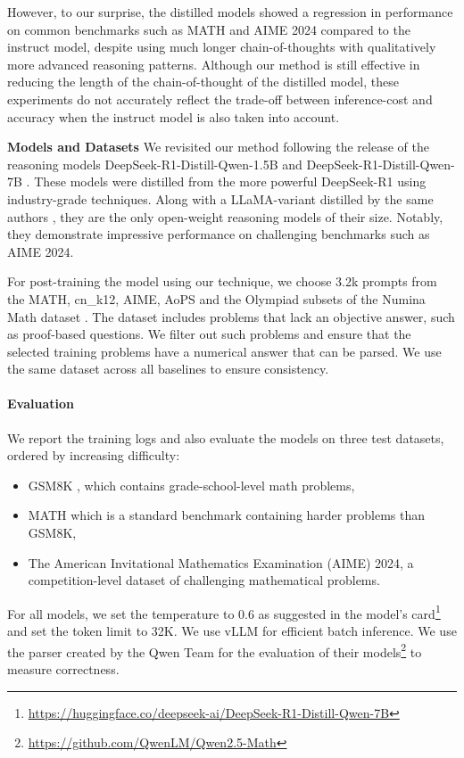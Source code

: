 However, to our surprise, the distilled models showed a regression in performance on common benchmarks such as MATH and AIME 2024 compared to the instruct model,
despite using much longer chain-of-thoughts with qualitatively more advanced reasoning patterns.
Although our method is still effective in reducing the length of the chain-of-thought of the distilled model, these experiments do not accurately reflect the trade-off between inference-cost and accuracy when the instruct model is also taken into account.

\textbf{Models and Datasets}  We revisited our method following the release of the reasoning models DeepSeek-R1-Distill-Qwen-1.5B and DeepSeek-R1-Distill-Qwen-7B \cite{guo2025deepseek}. These models were distilled from the more powerful DeepSeek-R1 using industry-grade techniques. Along with a LLaMA-variant distilled by the same authors \cite{guo2025deepseek}, they are the only open-weight reasoning models of their size. Notably, they demonstrate impressive performance on challenging benchmarks such as AIME 2024.

For post-training the model using our technique, we choose 3.2k prompts from the MATH, cn\_k12, AIME, AoPS and the Olympiad subsets of the Numina Math dataset \cite{numina_math_datasets}. The dataset includes problems that lack an objective answer, such as proof-based questions. We filter out such problems and ensure that the selected training problems have a numerical answer that can be parsed. We use the same dataset across all baselines to ensure consistency.

\paragraph{Evaluation}
We report the training logs and also evaluate the models on three test datasets, ordered by increasing difficulty:

\begin{itemize}
    \item GSM8K \cite{cobbe2021trainingverifierssolvemath}, which contains grade-school-level math problems,
    \item MATH \cite{hendrycks2021measuring} which is a standard benchmark containing harder problems than GSM8K,
    \item The American Invitational Mathematics Examination (AIME) 2024, a competition-level dataset of challenging mathematical problems.
\end{itemize}

For all models, we set the temperature to 0.6 as suggested in the model's card\footnote{\url{https://huggingface.co/deepseek-ai/DeepSeek-R1-Distill-Qwen-7B}} and set the token limit to 32K. We use vLLM \cite{kwon2023efficientmemorymanagementlarge} for efficient batch inference. 
We use the parser created by the Qwen Team for the evaluation of their models\footnote{\url{https://github.com/QwenLM/Qwen2.5-Math}} to measure correctness.

